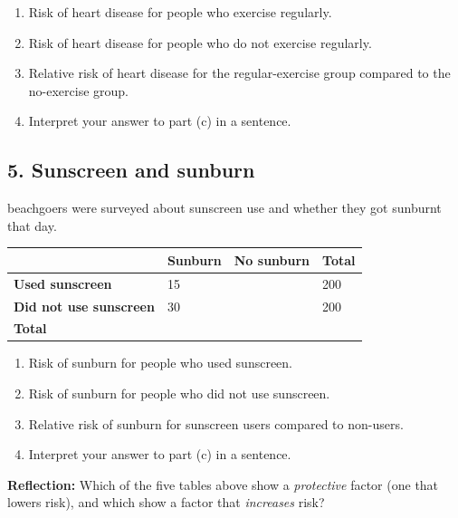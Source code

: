 \documentclass[11pt]{article}
\newcommand{\ans}{\hrulefill}
\newcommand{\anshere}{\par\vspace{0.3em}\noindent\ans\par\vspace{0.3em}}
\begin{document}
\begin{enumerate}
  \item Risk of heart disease for people who exercise regularly. \ans
  \item Risk of heart disease for people who do not exercise regularly. \ans
  \item Relative risk of heart disease for the regular-exercise group compared to the no-exercise group. \ans
  \item Interpret your answer to part (c) in a sentence.\anshere
\end{enumerate}

\newpage
\subsection*{5. Sunscreen and sunburn}
 beachgoers were surveyed about sunscreen use and whether they got sunburnt that day.

\begin{center}
\begin{tabular}{|L|Y|Y|Y|}
\hline
 & Sunburn & No sunburn & \textbf{Total} \\\hline
\textbf{Used sunscreen}    & 15 & & 200 \\\hline
\textbf{Did not use sunscreen} & 30 & & 200 \\\hline
\textbf{Total}             &    & &     \\\hline
\end{tabular}
\end{center}

\begin{enumerate}
  \item Risk of sunburn for people who used sunscreen. \ans
  \item Risk of sunburn for people who did not use sunscreen. \ans
  \item Relative risk of sunburn for sunscreen users compared to non-users. \ans
  \item Interpret your answer to part (c) in a sentence.\anshere
\end{enumerate}

\vspace{0.5em}
\noindent \textbf{Reflection:} Which of the five tables above show a \emph{protective} factor (one that lowers risk), and which show a factor that \emph{increases} risk? \anshere
\end{document}
